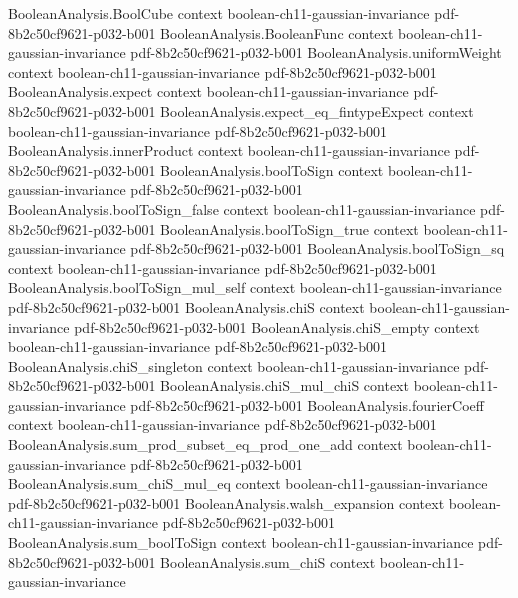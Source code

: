 \begin{theorem}
\proofstep
  {BooleanAnalysis.BoolCube}
  {context}
  {boolean-ch11-gaussian-invariance}
  {pdf-8b2c50cf9621-p032-b001}
\proofstep
  {BooleanAnalysis.BooleanFunc}
  {context}
  {boolean-ch11-gaussian-invariance}
  {pdf-8b2c50cf9621-p032-b001}
\proofstep
  {BooleanAnalysis.uniformWeight}
  {context}
  {boolean-ch11-gaussian-invariance}
  {pdf-8b2c50cf9621-p032-b001}
\proofstep
  {BooleanAnalysis.expect}
  {context}
  {boolean-ch11-gaussian-invariance}
  {pdf-8b2c50cf9621-p032-b001}
\proofstep
  {BooleanAnalysis.expect_eq_fintypeExpect}
  {context}
  {boolean-ch11-gaussian-invariance}
  {pdf-8b2c50cf9621-p032-b001}
\proofstep
  {BooleanAnalysis.innerProduct}
  {context}
  {boolean-ch11-gaussian-invariance}
  {pdf-8b2c50cf9621-p032-b001}
\proofstep
  {BooleanAnalysis.boolToSign}
  {context}
  {boolean-ch11-gaussian-invariance}
  {pdf-8b2c50cf9621-p032-b001}
\proofstep
  {BooleanAnalysis.boolToSign_false}
  {context}
  {boolean-ch11-gaussian-invariance}
  {pdf-8b2c50cf9621-p032-b001}
\proofstep
  {BooleanAnalysis.boolToSign_true}
  {context}
  {boolean-ch11-gaussian-invariance}
  {pdf-8b2c50cf9621-p032-b001}
\proofstep
  {BooleanAnalysis.boolToSign_sq}
  {context}
  {boolean-ch11-gaussian-invariance}
  {pdf-8b2c50cf9621-p032-b001}
\proofstep
  {BooleanAnalysis.boolToSign_mul_self}
  {context}
  {boolean-ch11-gaussian-invariance}
  {pdf-8b2c50cf9621-p032-b001}
\proofstep
  {BooleanAnalysis.chiS}
  {context}
  {boolean-ch11-gaussian-invariance}
  {pdf-8b2c50cf9621-p032-b001}
\proofstep
  {BooleanAnalysis.chiS_empty}
  {context}
  {boolean-ch11-gaussian-invariance}
  {pdf-8b2c50cf9621-p032-b001}
\proofstep
  {BooleanAnalysis.chiS_singleton}
  {context}
  {boolean-ch11-gaussian-invariance}
  {pdf-8b2c50cf9621-p032-b001}
\proofstep
  {BooleanAnalysis.chiS_mul_chiS}
  {context}
  {boolean-ch11-gaussian-invariance}
  {pdf-8b2c50cf9621-p032-b001}
\proofstep
  {BooleanAnalysis.fourierCoeff}
  {context}
  {boolean-ch11-gaussian-invariance}
  {pdf-8b2c50cf9621-p032-b001}
\proofstep
  {BooleanAnalysis.sum_prod_subset_eq_prod_one_add}
  {context}
  {boolean-ch11-gaussian-invariance}
  {pdf-8b2c50cf9621-p032-b001}
\proofstep
  {BooleanAnalysis.sum_chiS_mul_eq}
  {context}
  {boolean-ch11-gaussian-invariance}
  {pdf-8b2c50cf9621-p032-b001}
\proofstep
  {BooleanAnalysis.walsh_expansion}
  {context}
  {boolean-ch11-gaussian-invariance}
  {pdf-8b2c50cf9621-p032-b001}
\proofstep
  {BooleanAnalysis.sum_boolToSign}
  {context}
  {boolean-ch11-gaussian-invariance}
  {pdf-8b2c50cf9621-p032-b001}
\proofstep
  {BooleanAnalysis.sum_chiS}
  {context}
  {boolean-ch11-gaussian-invariance}

\end{theorem}
